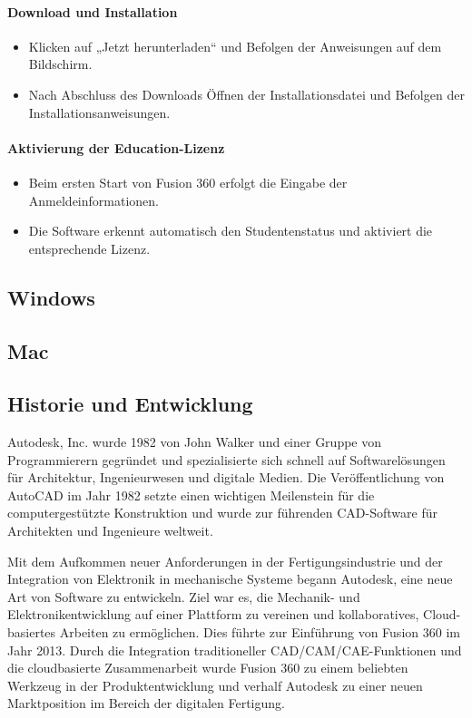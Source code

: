 {\paragraph{ Download und Installation}
\begin{itemize}
	\item Klicken auf „Jetzt herunterladen“ und Befolgen der Anweisungen auf dem Bildschirm.
	\item Nach Abschluss des Downloads Öffnen der Installationsdatei und Befolgen der Installationsanweisungen.
\end{itemize}

\paragraph*{Aktivierung der Education-Lizenz}
\begin{itemize}
	\item Beim ersten Start von Fusion 360 erfolgt die Eingabe der Anmeldeinformationen.
	\item Die Software erkennt automatisch den Studentenstatus und aktiviert die entsprechende Lizenz.
\end{itemize}




\subsection*{Windows}
\subsection*{Mac}
\subsection{Historie und Entwicklung}
Autodesk, Inc. wurde 1982 von John Walker und einer Gruppe von Programmierern gegründet und spezialisierte sich schnell auf Softwarelösungen für Architektur, Ingenieurwesen und digitale Medien. \autocite{wikipedia_autodesk}
Die Veröffentlichung von AutoCAD im Jahr 1982 setzte einen wichtigen Meilenstein für die computergestützte Konstruktion und wurde zur führenden CAD-Software für Architekten und Ingenieure weltweit.\autocite{wikipedia_autocad_version_history}


Mit dem Aufkommen neuer Anforderungen in der Fertigungsindustrie und der Integration von Elektronik in mechanische Systeme begann Autodesk, eine neue Art von Software zu entwickeln. Ziel war es, die Mechanik- und Elektronikentwicklung auf einer Plattform zu vereinen und kollaboratives, Cloud-basiertes Arbeiten zu ermöglichen. Dies führte zur Einführung von Fusion 360 im Jahr 2013. \autocite{wikipedia_autodesk_deutsch}
Durch die Integration traditioneller CAD/CAM/CAE-Funktionen und die cloudbasierte Zusammenarbeit wurde Fusion 360 zu einem beliebten Werkzeug in der Produktentwicklung und verhalf Autodesk zu einer neuen Marktposition im Bereich der digitalen Fertigung.
}

